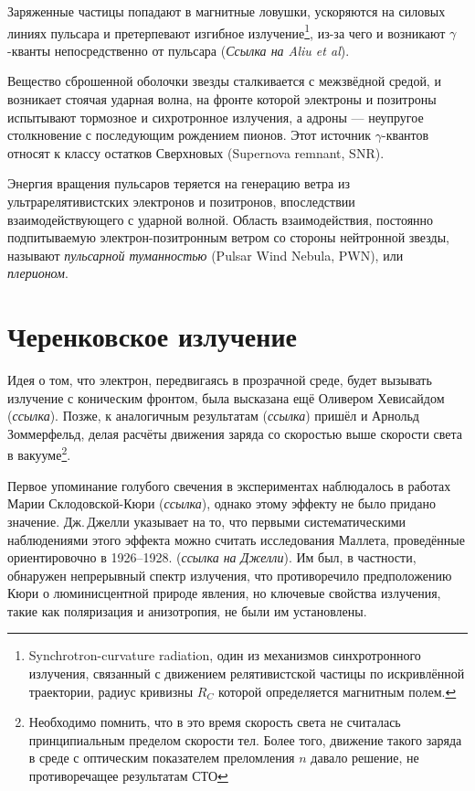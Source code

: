 \documentclass[magd,floatypics,numeref]{msudipl} %
\begin{document}
Заряженные частицы попадают в магнитные ловушки, ускоряются на силовых линиях пульсара и претерпевают изгибное излучение\footnote{Synchrotron-curvature radiation, один из механизмов синхротронного излучения, связанный с движением релятивистской частицы по искривлённой траектории, радиус кривизны $R_C$ которой определяется магнитным полем.}, из-за чего и возникают $\gamma$-кванты непосредственно от пульсара (\textit{Ссылка на Aliu et al}). 

Вещество сброшенной оболочки звезды сталкивается с межзвёдной средой, и возникает стоячая ударная волна, на фронте которой электроны и позитроны испытывают тормозное и сихротронное излучения, а адроны --- неупругое столкновение с последующим рождением пионов. Этот источник $\gamma$-квантов относят к классу остатков Сверхновых (Supernova remnant, SNR).

Энергия вращения пульсаров теряется на генерацию ветра из ультрарелятивистских электронов и позитронов, впоследствии взаимодействующего с ударной волной. Область взаимодействия, постоянно подпитываемую электрон-позитронным ветром со стороны нейтронной звезды, называют \textit{пульсарной туманностью} (Pulsar Wind Nebula, PWN), или \textit{плерионом}.

\section{Черенковское излучение}
Идея о том, что электрон, передвигаясь в прозрачной среде, будет вызывать излучение с коническим фронтом, была высказана ещё Оливером Хевисайдом (\textit{ссылка}).
Позже, к аналогичным результатам (\textit{ссылка}) пришёл и Арнольд Зоммерфельд, делая расчёты движения заряда со скоростью выше скорости света в вакууме\footnote{Необходимо помнить, что в это время скорость света не считалась принципиальным пределом скорости тел. Более того, движение такого заряда в среде с оптическим показателем преломления $n$ давало решение, не противоречащее результатам СТО}. 

Первое упоминание голубого свечения в экспериментах наблюдалось в работах Марии Склодовской-Кюри (\textit{ссылка}), однако этому эффекту не было придано значение. Дж.\,Джелли указывает на то, что первыми систематическими наблюдениями этого эффекта можно считать исследования Маллета, проведённые ориентировочно в 1926--1928. (\textit{ссылка на Джелли}). Им был, в частности, обнаружен непрерывный спектр излучения, что противоречило предположению Кюри о люминисцентной природе явления, но ключевые свойства излучения, такие как поляризация и анизотропия, не были им установлены. 
\end{document}
